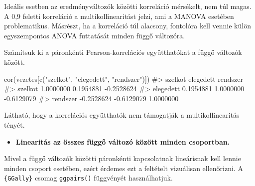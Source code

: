 \documentclass[
  letterpaper,
]{krantz}
\makeatletter
\newenvironment{Shaded}{\begin{snugshade}}{\end{snugshade}}
\newcommand{\AttributeTok}[1]{\textcolor[rgb]{0.40,0.45,0.13}{#1}}
\newcommand{\CommentTok}[1]{\textcolor[rgb]{0.37,0.37,0.37}{#1}}
\newcommand{\FunctionTok}[1]{\textcolor[rgb]{0.28,0.35,0.67}{#1}}
\newcommand{\NormalTok}[1]{\textcolor[rgb]{0.00,0.23,0.31}{#1}}
\newcommand{\OtherTok}[1]{\textcolor[rgb]{0.00,0.23,0.31}{#1}}
\newcommand{\SpecialCharTok}[1]{\textcolor[rgb]{0.37,0.37,0.37}{#1}}
\newcommand{\StringTok}[1]{\textcolor[rgb]{0.13,0.47,0.30}{#1}}
\providecommand{\tightlist}{%
  \setlength{\itemsep}{0pt}\setlength{\parskip}{0pt}}\usepackage{longtable,booktabs,array}
\newenvironment{kframe}{%
\medskip{}
\setlength{\fboxsep}{.8em}
 \def\at@end@of@kframe{}%
 \ifinner\ifhmode%
  \def\at@end@of@kframe{\end{minipage}}%
  \begin{minipage}{\columnwidth}%
 \fi\fi%
 \def\FrameCommand##1{\hskip\@totalleftmargin \hskip-\fboxsep
 \colorbox{shadecolor}{##1}\hskip-\fboxsep
     \hskip-\linewidth \hskip-\@totalleftmargin \hskip\columnwidth}%
 \MakeFramed {\advance\hsize-\width
   \@totalleftmargin\z@ \linewidth\hsize
   \@setminipage}}%
 {\par\unskip\endMakeFramed%
 \at@end@of@kframe}
\renewenvironment{Shaded}{\begin{kframe}}{\end{kframe}}
\makeatother
\begin{document}
Ideális esetben az eredményváltozók közötti korreláció mérsékelt, nem
túl magas. A 0,9 feletti korreláció a multikollinearitást jelzi, ami a
MANOVA esetében problematikus. Másrészt, ha a korreláció túl alacsony,
fontolóra kell vennie külön egyszempontos ANOVA futtatását minden függő
változóra.

Számítsuk ki a páronkénti Pearson-korrelációs együtthatókat a függő
változók között.

\begin{Shaded}
\begin{Highlighting}[]
\FunctionTok{cor}\NormalTok{(vezetes[}\FunctionTok{c}\NormalTok{(}\StringTok{"szelkot"}\NormalTok{, }\StringTok{"elegedett"}\NormalTok{, }\StringTok{"rendszer"}\NormalTok{)])}
\CommentTok{\#\textgreater{}              szelkot  elegedett   rendszer}
\CommentTok{\#\textgreater{} szelkot    1.0000000  0.1954881 {-}0.2528624}
\CommentTok{\#\textgreater{} elegedett  0.1954881  1.0000000 {-}0.6129079}
\CommentTok{\#\textgreater{} rendszer  {-}0.2528624 {-}0.6129079  1.0000000}
\end{Highlighting}
\end{Shaded}

Látható, hogy a korrelációs együtthatók nem támogatják a
multikollinearitás tényét.

\begin{itemize}
\tightlist
\item
  \textbf{Linearitás az összes függő változó között minden csoportban.}
\end{itemize}

Mivel a függő változók közötti páronkénti kapcsolatnak lineárisnak kell
lennie minden csoport esetében, ezért érdemes ezt a feltételt vizuálisan
ellenőrizni. A \texttt{\{GGally\}} csomag \texttt{ggpairs()} függvényét
használhatjuk.

\begin{Shaded}
\end{Shaded}
\end{document}
